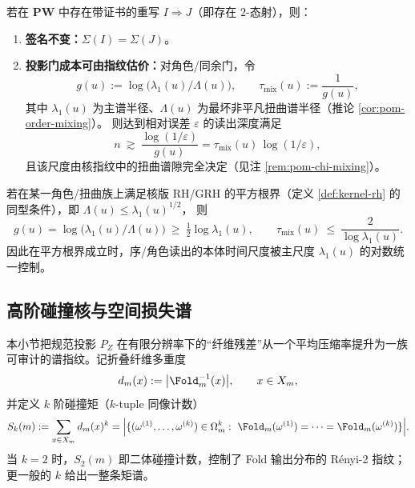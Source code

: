 \begin{proposition}[重写不变性与可估价闭环]\label{prop:pom-rewrite-audit-loop}
若在 $\mathbf{PW}$ 中存在带证书的重写 $I\Rightarrow J$（即存在 $2$-态射），则：
\begin{enumerate}
  \item \textbf{签名不变：}$\Sigma(I)=\Sigma(J)$。
  \item \textbf{投影门成本可由指纹估价：}对角色/同余门，令
  \[
  g(u):=\log\!\bigl(\lambda_1(u)/\Lambda(u)\bigr),
  \qquad
  \tau_{\mathrm{mix}}(u):=\frac{1}{g(u)},
  \]
  其中 $\lambda_1(u)$ 为主谱半径、$\Lambda(u)$ 为最坏非平凡扭曲谱半径（推论 \ref{cor:pom-order-mixing}）。
  则达到相对误差 $\varepsilon$ 的读出深度满足
  \[
  n\ \gtrsim\ \frac{\log(1/\varepsilon)}{g(u)}=\tau_{\mathrm{mix}}(u)\,\log(1/\varepsilon),
  \]
  且该尺度由核指纹中的扭曲谱隙完全决定（见注 \ref{rem:pom-chi-mixing}）。
\end{enumerate}
\end{proposition}

\begin{corollary}[GRH-型平方根界 \texorpdfstring{$\Rightarrow$}{=>} 混合尺度的通用上界]\label{cor:pom-grh-mix-upper}
若在某一角色/扭曲族上满足核版 RH/GRH 的平方根界（定义 \ref{def:kernel-rh} 的同型条件），即
\(
\Lambda(u)\le \lambda_1(u)^{1/2}
\)，
则
\[
g(u)=\log\!\bigl(\lambda_1(u)/\Lambda(u)\bigr)\ \ge\ \tfrac12\log\lambda_1(u),
\qquad
\tau_{\mathrm{mix}}(u)\ \le\ \frac{2}{\log\lambda_1(u)}.
\]
因此在平方根界成立时，序/角色读出的本体时间尺度被主尺度 $\lambda_1(u)$ 的对数统一控制。
\end{corollary}

\subsection{高阶碰撞核与空间损失谱}\label{subsec:pom-higher-collision-spectrum}
本小节把规范投影 $P_Z$ 在有限分辨率下的“纤维残差”从一个平均压缩率提升为一族可审计的谱指纹。记折叠纤维多重度
$$
d_m(x):=\bigl|\Fold_m^{-1}(x)\bigr|,\qquad x\in X_m,
$$
并定义 $k$ 阶碰撞矩（$k$-tuple 同像计数）
$$
S_k(m):=\sum_{x\in X_m} d_m(x)^k
=\Bigl|\{(\omega^{(1)},\dots,\omega^{(k)})\in\Omega_m^k:\ \Fold_m(\omega^{(1)})=\cdots=\Fold_m(\omega^{(k)})\}\Bigr|.
$$
当 $k=2$ 时，$S_2(m)$ 即二体碰撞计数，控制了 Fold 输出分布的 Rényi-2 指纹；更一般的 $k$ 给出一整条矩谱。

